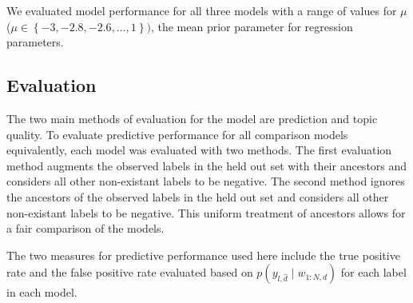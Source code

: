 We evaluated model performance for all three models with a range of
values for $\mu$ ($\mu\in\left\{ -3,-2.8,-2.6,\ldots,1\right\} )$,
the mean prior parameter for regression parameters.

\subsection{Evaluation}


The two main methods of evaluation
for the model are prediction and topic quality. To evaluate predictive
performance for all comparison models equivalently, each model was
evaluated with two methods. The first evaluation method augments the
observed labels in the held out set with their ancestors and considers
all other non-existant labels to be negative. The second method ignores
the ancestors of the observed labels in the held out set and considers
all other non-existant labels to be negative. This uniform treatment
of ancestors allows for a fair comparison of the models.

The two measures for predictive performance used here include the
true positive rate and the false positive rate evaluated based on
$p\left(y_{l,\hat{d}}\mid w_{1:N,d}\right)$ for each label in each
model.
